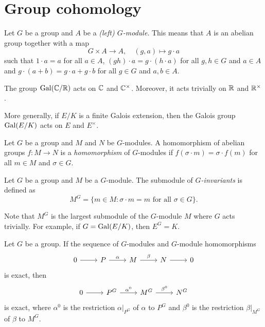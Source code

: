 \section{Group cohomology}
\lecture 

Let $G$ be a group and $A$ be a \emph{(left) $G$-module}. This means that $A$ is an abelian
group together with a map
\[
G\times A\to A,\quad
(g,a)\mapsto g\cdot a
\]
such that $1\cdot a=a$ for all $a\in A$, $(gh)\cdot a=g\cdot (h\cdot a)$ for 
all $g,h\in G$ and $a\in A$ and $g\cdot (a+b)=g\cdot a+g\cdot b$ for
all $g\in G$ and $a,b\in A$. 

\begin{example}
    The group $\operatorname{Gal}(\mathbb{C}/\mathbb{R})$ acts on $\mathbb{C}$ and $\mathbb{C}^\times$. Moreover, 
    it acts trivially on $\mathbb{R}$ and $\mathbb{R}^\times$. 
\end{example}

More generally, if $E/K$ is a finite Galois extension, then 
the Galois group $\operatorname{Gal}(E/K)$ acts on $E$ and $E^\times$. 

\begin{definition}
    Let $G$ be a group and $M$ and $N$ be $G$-modules. A homomorphism of abelian groups 
    $f\colon M\to N$ is a \emph{homomorphism} of $G$-modules
    if $f(\sigma\cdot m)=\sigma\cdot f(m)$ for all $m\in M$ and $\sigma\in G$.
\end{definition}

\begin{definition}
    Let $G$ be a group and $M$ be a $G$-module.
    The submodule of \emph{$G$-invariants} is defined as
    \[
    M^G=\{m\in M:\sigma\cdot m=m\text{ for all $\sigma\in G$}\}.
    \]
\end{definition}

Note that $M^G$ is the largest submodule of the $G$-module 
$M$ where $G$ acts trivially. For example, if 
$G=\operatorname{Gal}(E/K)$, then $E^G=K$. 

\begin{proposition}
\label{pro:H0}
    Let $G$ be a group. If the sequence
of $G$-modules and $G$-module homomorphisms
\[
\begin{tikzcd}
    0 & P & M & N & 0
    \arrow[from=1-1, to=1-2]
    \arrow["\alpha", from=1-2, to=1-3]
    \arrow["\beta", from=1-3, to=1-4]
    \arrow[from=1-4, to=1-5]
    \end{tikzcd}\]
is exact, then 
\[
\begin{tikzcd}
                        0 & P^G & M^G & N^G 
                        \arrow[from=1-1, to=1-2]
                        \arrow["\alpha^0", from=1-2, to=1-3]
                        \arrow["\beta^0", from=1-3, to=1-4]
        \end{tikzcd}
        \]
is exact, where $\alpha^0$ is the restriction $\alpha|_{P^G}$ of $\alpha$ to $P^G$ and
$\beta^0$ is the restriction $\beta|_{M^G}$ of $\beta$ to $M^G$. 
\end{proposition}

